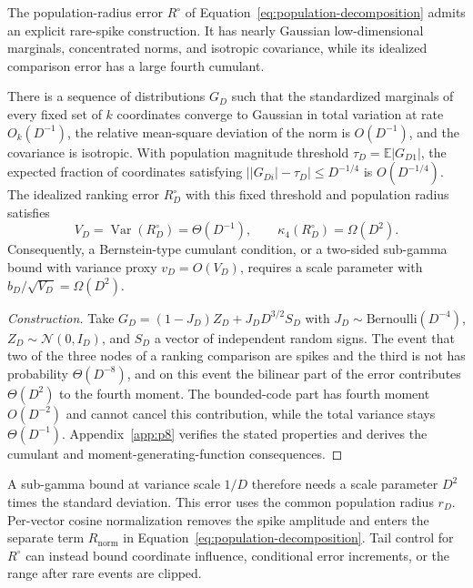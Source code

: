 \documentclass[twoside,11pt]{article}
\newcommand{\E}{\mathbb{E}}
\newcommand{\Var}{\operatorname{Var}}
\begin{document}
The population-radius error $R^\circ$ of Equation~\eqref{eq:population-decomposition} admits an explicit rare-spike construction. It has nearly Gaussian low-dimensional marginals, concentrated norms, and isotropic covariance, while its idealized comparison error has a large fourth cumulant.

\begin{theorem}
\label{thm:counterexample}
There is a sequence of distributions $G_D$ such that the standardized marginals of every fixed set of $k$ coordinates converge to Gaussian in total variation at rate $O_k(D^{-1})$, the relative mean-square deviation of the norm is $O(D^{-1})$, and the covariance is isotropic. With population magnitude threshold $\tau_D=\E|G_{D1}|$, the expected fraction of coordinates satisfying $\bigl||G_{Di}|-\tau_D\bigr|\le D^{-1/4}$ is $O(D^{-1/4})$. The idealized ranking error $R_D^\circ$ with this fixed threshold and population radius satisfies
\begin{equation}
V_D=\Var(R_D^\circ)=\Theta(D^{-1}),\qquad \kappa_4(R_D^\circ)=\Omega(D^2).
\end{equation}
Consequently, a Bernstein-type cumulant condition, or a two-sided sub-gamma bound with variance proxy $v_D=O(V_D)$, requires a scale parameter with $b_D/\sqrt{V_D}=\Omega(D^2)$.
\end{theorem}

\begin{proof}[Construction]
Take $G_D=(1-J_D)Z_D+J_DD^{3/2}S_D$ with $J_D\sim\mathrm{Bernoulli}(D^{-4})$, $Z_D\sim\mathcal N(0,I_D)$, and $S_D$ a vector of independent random signs. The event that two of the three nodes of a ranking comparison are spikes and the third is not has probability $\Theta(D^{-8})$, and on this event the bilinear part of the error contributes $\Theta(D^2)$ to the fourth moment. The bounded-code part has fourth moment $O(D^{-2})$ and cannot cancel this contribution, while the total variance stays $\Theta(D^{-1})$. Appendix~\ref{app:p8} verifies the stated properties and derives the cumulant and moment-generating-function consequences.
\end{proof}

A sub-gamma bound at variance scale $1/D$ therefore needs a scale parameter $D^2$ times the standard deviation. This error uses the common population radius $r_D$. Per-vector cosine normalization removes the spike amplitude and enters the separate term $R_{\mathrm{norm}}$ in Equation~\eqref{eq:population-decomposition}. Tail control for $R^\circ$ can instead bound coordinate influence, conditional error increments, or the range after rare events are clipped.
\end{document}
